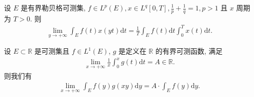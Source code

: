 \documentclass[../../main.tex]{subfiles}%
\begin{document}
\begin{theorem}[$L^p$版本Riemann引理]\label{theorem:L^p版本Riemann引理}
设 $E$ 是有界勒贝格可测集, $f \in L^p(E), x \in L^q[0,T], \frac{1}{p} + \frac{1}{q} = 1, p > 1$ 且 $x$ 周期为 $T > 0$. 则
\begin{align*}
\lim_{y \to +\infty} \int_E f(t) x(yt) \mathrm{d}t = \frac{1}{T} \int_E f(t) \mathrm{d}t \int_0^T x(t) \mathrm{d}t.
\end{align*}
\end{theorem}

\begin{theorem}\label{theorem:L^1版本的Riemann引理}
设 $E \subset \mathbb{R}$ 是可测集且 $f \in L^1(E)$, $g$ 是定义在 $\mathbb{R}$ 的有界可测函数, 满足
\begin{align*}
\lim_{x \to +\infty} \frac{1}{x} \int_0^x g(t) \mathrm{d}t = A \in \mathbb{R}.
\end{align*}
则我们有
\begin{align*}
\lim_{x \to +\infty} \int_E f(y) g(xy) \mathrm{d}y = A \cdot \int_E f(y) \mathrm{d}y.
\end{align*}
\end{theorem}
\end{document}
